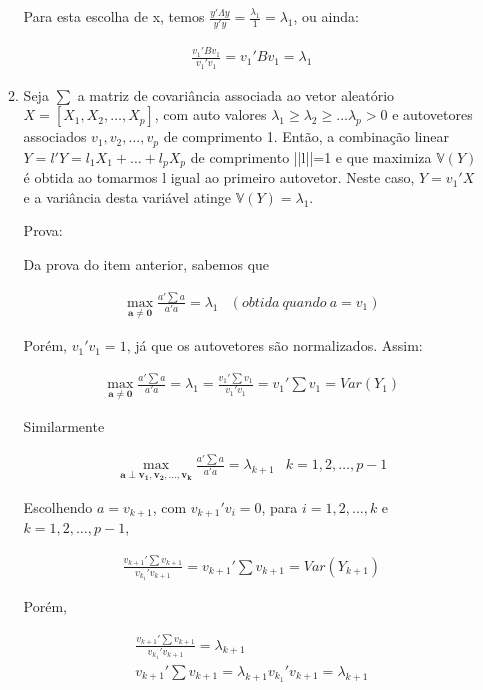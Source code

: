 \documentclass[11pt,a4paper]{book}
\DeclareMathOperator*{\maxi}{max}
\begin{document}
\begin{enumerate}
\begin{enumerate}[label=\alph*)]
			Para esta escolha de x, temos $\frac{y'\Lambda y}{y'y}=\frac{\lambda_1}{1}=\lambda_1$, ou ainda:
			
			\begin{eqnarray*}
				\frac{v_1'Bv_1}{v_1'v_1}=v_1'Bv_1=\lambda_1
			\end{eqnarray*}
			
			\item 
			Seja $\sum$ a matriz de covariância associada ao vetor aleatório $X=\left[ X_1,X_2,\ldots,X_p\right]$, com auto valores $\lambda_1 \geq\lambda_2\geq \ldots\lambda_p > 0$ e autovetores associados $v_1, v_2,\ldots, v_p$ de comprimento 1.
			Então, a combinação linear $Y=l'Y=l_1X_1+\ldots +l_pX_p$ de comprimento ||l||=1 e que maximiza $\mathbb{V}(Y)$ é obtida ao tomarmos l igual ao primeiro autovetor.
			Neste caso, $Y=v_1'X$ e a variância desta variável atinge $\mathbb{V}(Y)=\lambda_1$.
			
			Prova:
			
			Da prova do item anterior, sabemos que
			
			\begin{eqnarray*}
				\maxi_{\mathbf{a\neq 0}} \frac{a'\sum a}{a'a}=\lambda_1 & (obtida~quando~a=v_1)
			\end{eqnarray*}
			
			Porém, $v_1'v_1=1$, já que os autovetores são normalizados.
			Assim:
			
			\begin{eqnarray*}
				\maxi_{\mathbf{a\neq 0}} \frac{a'\sum a}{a'a}=\lambda_1=\frac{v_1'\sum v_1}{v_1'v_1}=v_1'\sum v_1=Var(Y_1)
			\end{eqnarray*}
			
			Similarmente
			
			\begin{eqnarray*}
				\maxi_{\mathbf{a\perp v_1,v_2,\ldots,v_k}} \frac{a'\sum a}{a'a}=\lambda_{k+1} & k=1,2,\ldots,p-1
			\end{eqnarray*}
			
			Escolhendo $a=v_{k+1}$, com $v_{k+1}'v_i=0$, para $i=1,2,\ldots,k$ e $k=1,2,\ldots,p-1$,
			
			\begin{eqnarray*}
				\frac{v_{k+1}'\sum v_{k+1}}{v_{k_1}'v_{k+1}}=v_{k+1}'\sum v_{k+1}=Var(Y_{k+1})
			\end{eqnarray*}
			
			Porém,
			
			\begin{eqnarray*}
				\frac{v_{k+1}'\sum v_{k+1}}{v_{k_1}'v_{k+1}}=\lambda_{k+1}\\
				v_{k+1}'\sum v_{k+1}=\lambda_{k+1}v_{k_1}'v_{k+1}=\lambda_{k+1}
			\end{eqnarray*}
			

\end{enumerate}
\end{enumerate}
\end{document}
